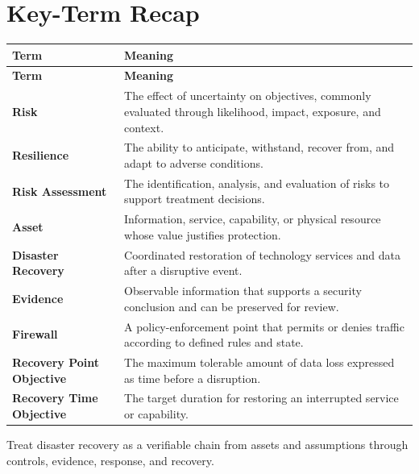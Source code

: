 \documentclass[11pt]{article}
\begin{document}
\section*{Key-Term Recap}
\begin{longtable}{>{\RaggedRight\arraybackslash}p{}>{\RaggedRight\arraybackslash}p{}}
\toprule\rowcolor{Navy}\color{white}\textbf{Term} & \color{white}\textbf{Meaning}\\\midrule
\endfirsthead
\toprule\rowcolor{Navy}\color{white}\textbf{Term} & \color{white}\textbf{Meaning}\\\midrule
\endhead
\textbf{Risk} & The effect of uncertainty on objectives, commonly evaluated through likelihood, impact, exposure, and context. \\\midrule
\textbf{Resilience} & The ability to anticipate, withstand, recover from, and adapt to adverse conditions. \\\midrule
\textbf{Risk Assessment} & The identification, analysis, and evaluation of risks to support treatment decisions. \\\midrule
\textbf{Asset} & Information, service, capability, or physical resource whose value justifies protection. \\\midrule
\textbf{Disaster Recovery} & Coordinated restoration of technology services and data after a disruptive event. \\\midrule
\textbf{Evidence} & Observable information that supports a security conclusion and can be preserved for review. \\\midrule
\textbf{Firewall} & A policy-enforcement point that permits or denies traffic according to defined rules and state. \\\midrule
\textbf{Recovery Point Objective} & The maximum tolerable amount of data loss expressed as time before a disruption. \\\midrule
\textbf{Recovery Time Objective} & The target duration for restoring an interrupted service or capability. \\\midrule
\bottomrule
\end{longtable}
\begin{takeawaybox}
Treat disaster recovery as a verifiable chain from assets and assumptions through controls, evidence, response, and recovery.
\end{takeawaybox}
\end{document}
